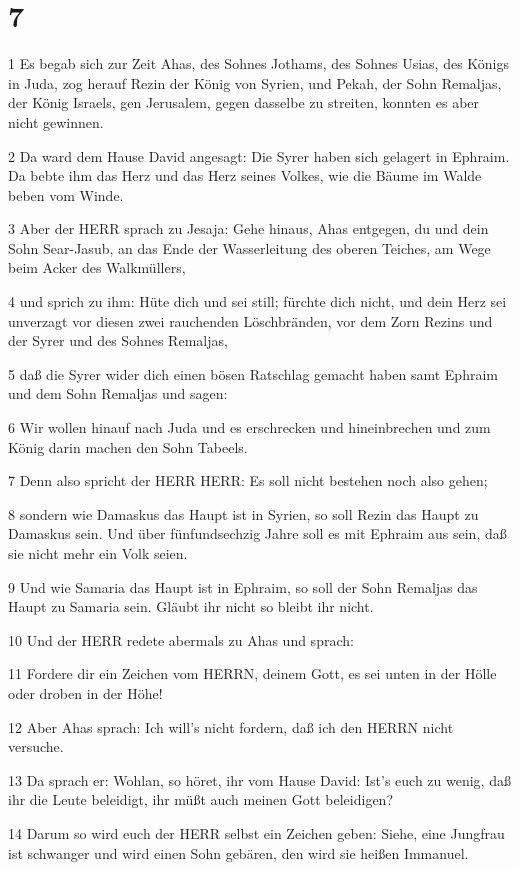 \chapter{7}

\par 1 Es begab sich zur Zeit Ahas, des Sohnes Jothams, des Sohnes Usias, des Königs in Juda, zog herauf Rezin der König von Syrien, und Pekah, der Sohn Remaljas, der König Israels, gen Jerusalem, gegen dasselbe zu streiten, konnten es aber nicht gewinnen.
\par 2 Da ward dem Hause David angesagt: Die Syrer haben sich gelagert in Ephraim. Da bebte ihm das Herz und das Herz seines Volkes, wie die Bäume im Walde beben vom Winde.
\par 3 Aber der HERR sprach zu Jesaja: Gehe hinaus, Ahas entgegen, du und dein Sohn Sear-Jasub, an das Ende der Wasserleitung des oberen Teiches, am Wege beim Acker des Walkmüllers,
\par 4 und sprich zu ihm: Hüte dich und sei still; fürchte dich nicht, und dein Herz sei unverzagt vor diesen zwei rauchenden Löschbränden, vor dem Zorn Rezins und der Syrer und des Sohnes Remaljas,
\par 5 daß die Syrer wider dich einen bösen Ratschlag gemacht haben samt Ephraim und dem Sohn Remaljas und sagen:
\par 6 Wir wollen hinauf nach Juda und es erschrecken und hineinbrechen und zum König darin machen den Sohn Tabeels.
\par 7 Denn also spricht der HERR HERR: Es soll nicht bestehen noch also gehen;
\par 8 sondern wie Damaskus das Haupt ist in Syrien, so soll Rezin das Haupt zu Damaskus sein. Und über fünfundsechzig Jahre soll es mit Ephraim aus sein, daß sie nicht mehr ein Volk seien.
\par 9 Und wie Samaria das Haupt ist in Ephraim, so soll der Sohn Remaljas das Haupt zu Samaria sein. Gläubt ihr nicht so bleibt ihr nicht.
\par 10 Und der HERR redete abermals zu Ahas und sprach:
\par 11 Fordere dir ein Zeichen vom HERRN, deinem Gott, es sei unten in der Hölle oder droben in der Höhe!
\par 12 Aber Ahas sprach: Ich will's nicht fordern, daß ich den HERRN nicht versuche.
\par 13 Da sprach er: Wohlan, so höret, ihr vom Hause David: Ist's euch zu wenig, daß ihr die Leute beleidigt, ihr müßt auch meinen Gott beleidigen?
\par 14 Darum so wird euch der HERR selbst ein Zeichen geben: Siehe, eine Jungfrau ist schwanger und wird einen Sohn gebären, den wird sie heißen Immanuel.
